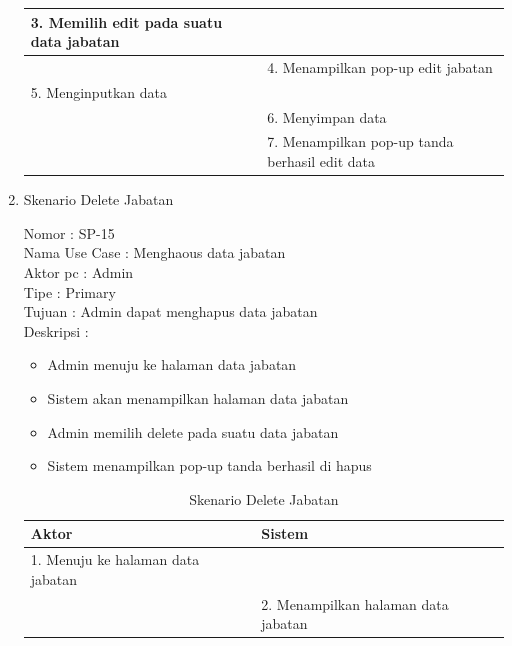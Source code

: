 \begin{enumerate}
\begin{table}
\begin{tabular}{ | l | p{65mm} |}
		3. Memilih edit pada suatu data jabatan & \\
		
		\hline
		
		& 4.	Menampilkan pop-up edit jabatan \\
		
		\hline
		
		5.	Menginputkan data  & \\
		\hline
		
		& 6.	Menyimpan data \\
		\hline
		
		& 7.	Menampilkan pop-up tanda berhasil edit data \\
		\hline
		
	\end{tabular}
\end{table}

\item Skenario Delete Jabatan

Nomor \kern 3.6pc : SP-15 \\
Nama Use Case : Menghaous data jabatan \\
Aktor  pc : Admin \\
Tipe \kern 4.6pc : Primary \\
Tujuan \kern 3.6pc : Admin dapat menghapus data jabatan \\
Deskripsi \kern 2.5pc : 

\begin{itemize}
	\item Admin menuju ke halaman data jabatan
	\item Sistem akan menampilkan halaman data jabatan
	\item Admin memilih delete pada suatu data jabatan
	\item Sistem menampilkan pop-up tanda berhasil di hapus
	
\end{itemize}

\begin{table}
	\caption{Skenario Delete Jabatan}
	\centering
	\begin{tabular}{ | p{55mm} | p{70mm}|}
		\hline 
		\textbf{Aktor} & \textbf{Sistem} \\
		\hline
		
		1.	Menuju ke halaman data jabatan &  \\
		
		\hline
		
		&  2.	Menampilkan halaman data jabatan \\
		

\end{tabular}
\end{table}
\end{enumerate}
